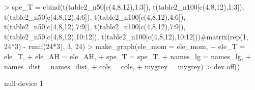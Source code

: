 \documentclass{article}
\begin{document}
\begin{Schunk}
\begin{Sinput}
> spe_T = cbind(t(table2_n50[c(4,8,12),1:3]), t(table2_n100[c(4,8,12),1:3]), t(table2_n50[c(4,8,12),4:6]), t(table2_n100[c(4,8,12),4:6]), t(table2_n50[c(4,8,12),7:9]), t(table2_n100[c(4,8,12),7:9]), t(table2_n50[c(4,8,12),10:12]), t(table2_n100[c(4,8,12),10:12]))#matrix(rep(1, 24*3) - runif(24*3), 3, 24)
> make_graph(ele_mom = ele_mom,
+            ele_T = ele_T,
+            ele_AH = ele_AH,
+            spe_T = spe_T,
+            names_lg = names_lg,
+            names_dist = names_dist,
+            cols = cols,
+            mygrey = mygrey)
> dev.off()
\end{Sinput}
\begin{Soutput}
null device 
          1 
\end{Soutput}
\end{Schunk}

\begin{figure}

\end{figure}
\end{document}
